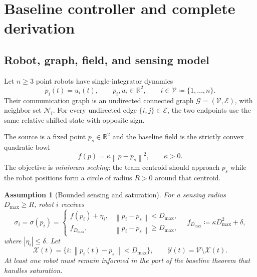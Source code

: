 \documentclass[11pt]{article}
\newtheorem{assumption}{Assumption}
\newcommand{\R}{\mathbb{R}}
\newcommand{\V}{\mathcal{V}}
\newcommand{\E}{\mathcal{E}}
\newcommand{\N}{\mathcal{N}}
\newcommand{\norm}[1]{\left\lVert #1\right\rVert}
\newcommand{\NotationContext}[1]{\markboth{#1}{#1}}
\begin{document}
\section{Baseline controller and complete derivation}\label{sec:baseline}
\NotationContext{core}

\subsection{Robot, graph, field, and sensing model}

Let $n\geq 3$ point robots have single-integrator dynamics
\begin{equation}\label{eq:single-integrator}
    \dot p_i(t)=u_i(t),\qquad p_i,u_i\in\R^2,\qquad i\in\V\coloneqq\{1,\ldots,n\}.
\end{equation}
Their communication graph is an undirected connected graph $\mathcal{G}=(\V,\E)$, with neighbor set $\N_i$. For every undirected edge $\{i,j\}\in\E$, the two endpoints use the same relative shifted state with opposite sign.

The source is a fixed point $p_s\in\R^2$ and the baseline field is the strictly convex quadratic bowl
\begin{equation}\label{eq:quadratic-field}
    f(p)=\kappa\norm{p-p_s}^2,\qquad \kappa>0.
\end{equation}
The objective is \emph{minimum seeking}: the team centroid should approach $p_s$ while the robot positions form a circle of radius $R>0$ around that centroid.

\begin{assumption}[Bounded sensing and saturation]\label{ass:sensing}
For a sensing radius $D_{\max}\geq R$, robot $i$ receives
\begin{equation}\label{eq:measurement}
\sigma_i=\sigma(p_i)=
\begin{cases}
f(p_i)+\eta_i, & \norm{p_i-p_s}<D_{\max},\\
f_{D_{\max}}, & \norm{p_i-p_s}\geq D_{\max},
\end{cases}
\quad
f_{D_{\max}}\coloneqq\kappa D_{\max}^2+\delta,
\end{equation}
where $|\eta_i|\leq\delta$. Let
\begin{equation}\label{eq:informed-sets}
    \mathcal{X}(t)=\{i:\norm{p_i(t)-p_s}<D_{\max}\},\qquad
    \mathcal{Y}(t)=\V\setminus\mathcal{X}(t).
\end{equation}
At least one robot must remain informed in the part of the baseline theorem that handles saturation.
\end{assumption}
\end{document}
